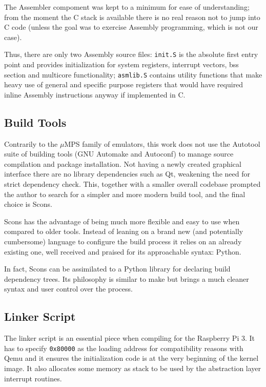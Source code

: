 \documentclass[12pt,a4paper,openright,twoside]{report}
\begin{document}
The Assembler compoment was kept to a minimum for ease of understanding; from
the moment the C stack is available there is no real reason not to jump into 
C code (unless the goal was to exercise Assembly programming, which is not our case).

Thus, there are only two Assembly source files: {\tt init.S} is the absolute first
entry point and provides initialization for system registers, interrupt vectors, 
bss section and multicore functionality; {\tt asmlib.S} contains utility functions
that make heavy use of general and specific purpose registers that would have
required inline Assembly instructions anyway if implemented in C.

\subsection{Build Tools}
Contrarily to the $\mu$MPS family of emulators, this work does not use the 
Autotool suite of building tools (GNU Automake and Autoconf) to manage source 
compilation and package installation.
Not having a newly created graphical interface there are no library dependencies
such as Qt, weakening the need for strict dependency check. 
This, together with a smaller overall codebase prompted the author to search 
for a simpler and more modern build tool, and the final choice is Scons.

Scons has the advantage of being much more flexible and easy to use when compared
to older tools. Instead of leaning on a brand new (and potentially cumbersome)
language to configure the build process it relies on an already existing one, well
received and praised for its approachable syntax: Python.

In fact, Scons can be assimilated to a Python library for declaring build dependency
trees. Its philosophy is similar to make but brings a much cleaner syntax and 
user control over the process. 

\subsection{Linker Script}
The linker script is an essential piece when compiling for the Raspberry Pi 3. It has
to specify {\tt 0x80000} as the loading address for compatibility reasons with Qemu
and it ensures the initialization code is at the very beginning of the kernel image.
It also allocates some memory as stack to be used by the abstraction layer interrupt
routines.
\end{document}
